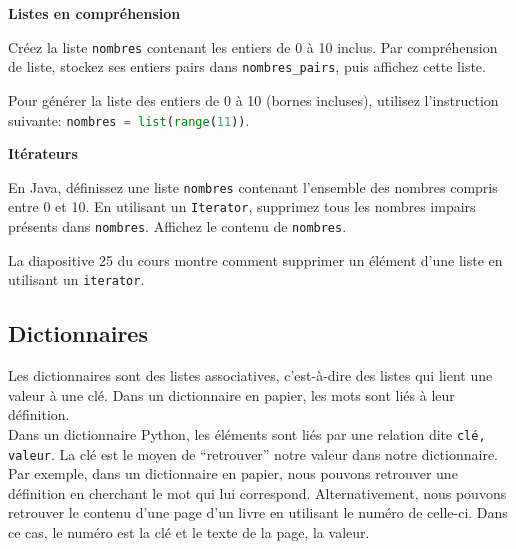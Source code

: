 \begin{Exercice}[5 minutes] [Python] \textbf{Listes en compréhension}

    Créez la liste \lstinline{nombres} contenant les entiers de 0 à 10 inclus. Par compréhension de liste, stockez ses entiers pairs dans \lstinline{nombres_pairs}, puis affichez cette liste.

    \begin{conseil}
        Pour générer la liste des entiers de 0 à 10 (bornes incluses), utilisez l'instruction suivante: \lstinline[language=python]{nombres = list(range(11))}.
    \end{conseil}

    \begin{solution}
        
    \end{solution}
\end{Exercice}

\begin{Exercice}[10 minutes] [Java] \textbf{Itérateurs}

    En Java, définissez une liste \lstinline{nombres} contenant l'ensemble des nombres compris entre 0 et 10. 
    En utilisant un \lstinline{Iterator}, supprimez tous les nombres impairs présents dans \lstinline{nombres}.
    Affichez le contenu de \lstinline{nombres}.

    \begin{conseil}
        La diapositive 25 du cours montre comment supprimer un élément d'une liste en utilisant un \lstinline{iterator}.
    \end{conseil}

    \begin{solution}
        
    \end{solution}
\end{Exercice}

	\subsection{Dictionnaires}
	Les dictionnaires sont des listes associatives, c'est-à-dire des listes qui lient une valeur à une clé. Dans un dictionnaire en papier, les mots sont liés à leur définition. \\
	
	Dans un dictionnaire Python, les éléments sont liés par une relation dite \lstinline{clé, valeur}. La clé est le moyen de “retrouver” notre valeur dans notre dictionnaire. Par exemple, dans un dictionnaire en papier, nous pouvons retrouver une définition en cherchant le mot qui lui correspond. Alternativement, nous pouvons retrouver le contenu d'une page d'un livre en utilisant le numéro de celle-ci. Dans ce cas, le numéro est la clé et le texte de la page, la valeur. \\
	
